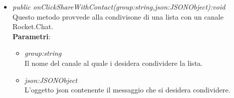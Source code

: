 \begin{itemize}
\begin{itemize}
\begin{itemize}
					\end{itemize} 
	\item \textit{public onClickShareWithContact(group:string,json:JSONObject):void}\\
	Questo metodo provvede alla condivisone di una lista con un canale Rocket.Chat.
					\\ \textbf{Parametri}: \begin{itemize}
			\item \textit{group:string}\\
			Il nome del canale al quale i desidera condividere la lista.
			\item \textit{json:JSONObject}\\
			L'oggetto json contenente il messaggio che si desidera condividere.
					\end{itemize} 
	\end{itemize}
\end{itemize} 
 
 
